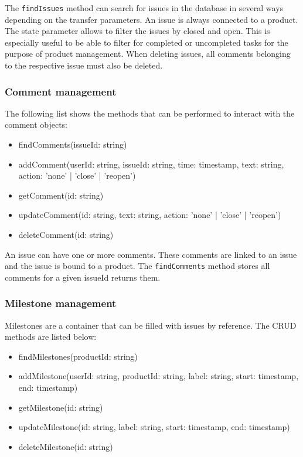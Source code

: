     The \texttt{findIssues} method can search for issues in the database in several ways depending on the transfer parameters. An issue is always connected to a product. The state parameter allows to filter the issues by closed and open. This is especially useful to be able to filter for completed or uncompleted tasks for  the purpose of product management. When deleting issues, all comments belonging to the respective issue must also be deleted.

    \subsubsection*{Comment management}
    The following list shows the methods that can be performed to interact with the comment objects:
    \begin{itemize}
        \item findComments(issueId: string)
        \item addComment(userId: string, issueId: string, time: timestamp, text: string, action: 'none' | 'close' | 'reopen')
        \item getComment(id: string)
        \item updateComment(id: string, text: string, action: 'none' | 'close' | 'reopen')
        \item deleteComment(id: string)
    \end{itemize}

    An issue can have one or more comments. These comments are linked to an issue and the issue is bound to a product. The \texttt{findComments} method stores all comments for a given issueId returns them. 

    \subsubsection*{Milestone management}
    Milestones are a container that can be filled with issues by reference. The CRUD methods are listed below:
    \begin{itemize}
        \item findMilestones(productId: string)
        \item addMilestone(userId: string, productId: string, label: string, start: timestamp, end: timestamp)
        \item getMilestone(id: string)
        \item updateMilestone(id: string, label: string, start: timestamp, end: timestamp)
        \item deleteMilestone(id: string)
    \end{itemize}

